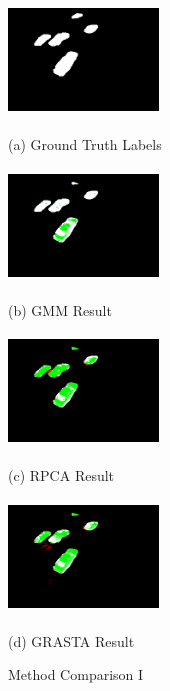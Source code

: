 \documentclass{article}
\begin{document}
\begin{figure}[t]

\begin{minipage}[b]{0.48\linewidth}
  \centering
  \centerline{\includegraphics[width=4cm, height=3cm]{Imgs/0112051333.png}}
  \centerline{(a) Ground Truth Labels}\medskip
\end{minipage}
\begin{minipage}[b]{0.48\linewidth}
  \centering
  \centerline{\includegraphics[width=4cm, height=3cm]{Imgs/0112051333_gmm_rwg.png}}
  \centerline{(b) GMM Result}\medskip
\end{minipage}

\begin{minipage}[b]{0.48\linewidth}
  \centering
  \centerline{\includegraphics[width=4cm, height =3cm]{Imgs/0112051333_rpca_rwg.png}}
  \centerline{(c) RPCA Result}\medskip
\end{minipage}
\begin{minipage}[b]{0.48\linewidth}
  \centering
  \centerline{\includegraphics[width=4cm, height = 3cm]{Imgs/0112051333_grasta_rwg.png}}
  \centerline{(d) GRASTA Result}\medskip
\end{minipage}

\caption{Method Comparison I}
\label{fig:methodComp1}
%
\end{figure}
\end{document}
